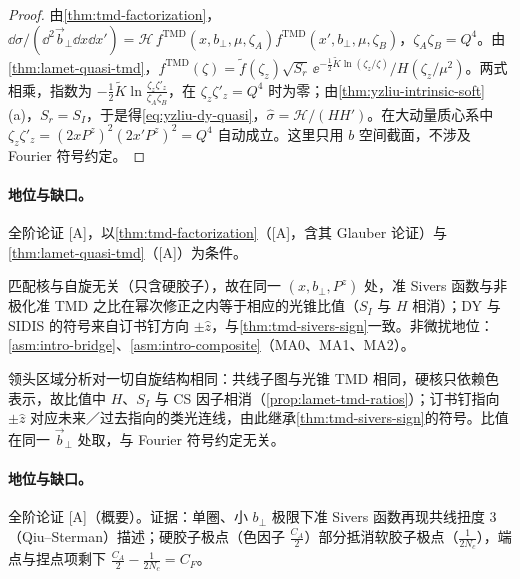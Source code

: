 \begin{proof}
由\cref{thm:tmd-factorization}，$\dd\sigma/(\dd^2\vec b_\perp\dd x\dd x')=\mathcal H\,f^{\mathrm{TMD}}(x,b_\perp,\mu,\zeta_A)f^{\mathrm{TMD}}(x',b_\perp,\mu,\zeta_B)$，$\zeta_A\zeta_B=Q^4$。由\cref{thm:lamet-quasi-tmd}，$f^{\mathrm{TMD}}(\zeta)=\tilde f(\zeta_z)\sqrt{S_r}\,\ee^{-\frac12\tilde K\ln(\zeta_z/\zeta)}/H(\zeta_z/\mu^2)$。两式相乘，指数为 $-\frac12\tilde K\ln\frac{\zeta_z\zeta'_z}{\zeta_A\zeta_B}$，在 $\zeta_z\zeta'_z=Q^4$ 时为零；由\cref{thm:yzliu-intrinsic-soft}(a)，$S_r=S_I$，于是得\cref{eq:yzliu-dy-quasi}，$\hat\sigma=\mathcal H/(HH')$。在大动量质心系中 $\zeta_z\zeta'_z=(2xP^z)^2(2x'P^z)^2=Q^4$ 自动成立。这里只用 $b$ 空间截面，不涉及 Fourier 符号约定。
\end{proof}

\paragraph{地位与缺口。}全阶论证 [A]，以\cref{thm:tmd-factorization}（[A]，含其 Glauber 论证）与\cref{thm:lamet-quasi-tmd}（[A]）为条件\cite[式~(22)]{Ji:2019sxk}\cite[式~(27)]{Ji:2019ewn}\cite[式~(155)]{Liu:2022nnk}。

\begin{proposition}\label{prop:yzliu-sivers}
匹配核与自旋无关（只含硬胶子），故在同一 $(x,b_\perp,P^z)$ 处，准 Sivers 函数与非极化准 TMD 之比在幂次修正之内等于相应的光锥比值（$S_I$ 与 $H$ 相消）；DY 与 SIDIS 的符号来自订书钉方向 $\pm\hat z$，与\cref{thm:tmd-sivers-sign}一致。非微扰地位：\cref{asm:intro-bridge}、\cref{asm:intro-composite}（MA0、MA1、MA2）。
\end{proposition}

\begin{proofsketch}
领头区域分析对一切自旋结构相同\cite[第~I--II~节]{Ji:2020jeb}：共线子图与光锥 TMD 相同，硬核只依赖色表示，故比值中 $H$、$S_I$ 与 CS 因子相消（\cref{prop:lamet-tmd-ratios}）；订书钉指向 $\pm\hat z$ 对应未来／过去指向的类光连线，由此继承\cref{thm:tmd-sivers-sign}的符号。比值在同一 $\vec b_\perp$ 处取，与 Fourier 符号约定无关。
\end{proofsketch}

\paragraph{地位与缺口。}全阶论证 [A]（概要）。证据：单圈、小 $b_\perp$ 极限下准 Sivers 函数再现共线扭度 3（Qiu--Sterman）描述；硬胶子极点（色因子 $\frac{C_A}2$）部分抵消软胶子极点（$\frac1{2N_c}$），端点与捏点项剩下 $\frac{C_A}2-\frac1{2N_c}=C_F$\cite[第~III~节]{Ji:2020jeb}。

